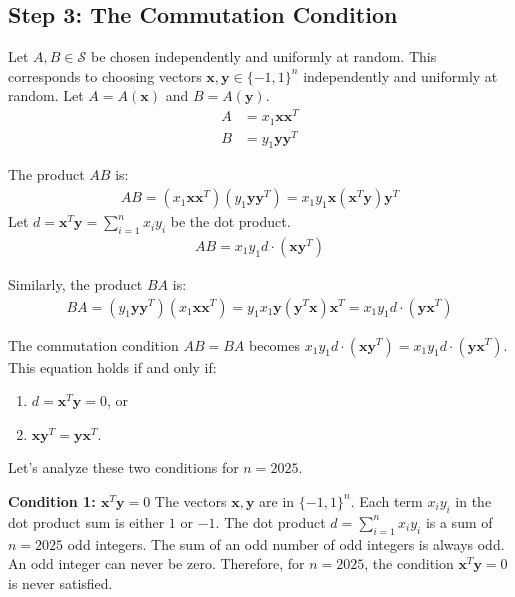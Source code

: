 \documentclass[12pt,a4paper]{article}
\theoremstyle{definition}
\begin{document}
        \subsection*{Step 3: The Commutation Condition}

        Let $A, B \in \mathcal{S}$ be chosen independently and uniformly at random. This corresponds to choosing vectors $\mathbf{x}, \mathbf{y} \in \{-1, 1\}^n$ independently and uniformly at random. Let $A = A(\mathbf{x})$ and $B = A(\mathbf{y})$.
        \begin{align}
            A &= x_1 \mathbf{x}\mathbf{x}^T\\
            B &= y_1 \mathbf{y}\mathbf{y}^T
        \end{align}

        The product $AB$ is:
        \begin{align}
            AB = (x_1 \mathbf{x}\mathbf{x}^T)(y_1 \mathbf{y}\mathbf{y}^T) = x_1 y_1 \mathbf{x}(\mathbf{x}^T\mathbf{y})\mathbf{y}^T
        \end{align}
        Let $d = \mathbf{x}^T\mathbf{y} = \sum_{i=1}^n x_i y_i$ be the dot product.
        \begin{align}
            AB = x_1 y_1 d \cdot (\mathbf{x}\mathbf{y}^T)
        \end{align}

        Similarly, the product $BA$ is:
        \begin{align}
            BA = (y_1 \mathbf{y}\mathbf{y}^T)(x_1 \mathbf{x}\mathbf{x}^T) = y_1 x_1 \mathbf{y}(\mathbf{y}^T\mathbf{x})\mathbf{x}^T = x_1 y_1 d \cdot (\mathbf{y}\mathbf{x}^T)
        \end{align}

        The commutation condition $AB=BA$ becomes $x_1 y_1 d \cdot (\mathbf{x}\mathbf{y}^T) = x_1 y_1 d \cdot (\mathbf{y}\mathbf{x}^T)$.
        This equation holds if and only if:
        \begin{enumerate}
            \item $d = \mathbf{x}^T\mathbf{y} = 0$, or
            \item $\mathbf{x}\mathbf{y}^T = \mathbf{y}\mathbf{x}^T$.
        \end{enumerate}

        Let's analyze these two conditions for $n=2025$.

        \textbf{Condition 1: $\mathbf{x}^T\mathbf{y} = 0$}
        The vectors $\mathbf{x}, \mathbf{y}$ are in $\{-1, 1\}^n$. Each term $x_i y_i$ in the dot product sum is either $1$ or $-1$. The dot product $d = \sum_{i=1}^n x_i y_i$ is a sum of $n=2025$ odd integers. The sum of an odd number of odd integers is always odd. An odd integer can never be zero. Therefore, for $n=2025$, the condition $\mathbf{x}^T\mathbf{y} = 0$ is never satisfied.
\end{document}
